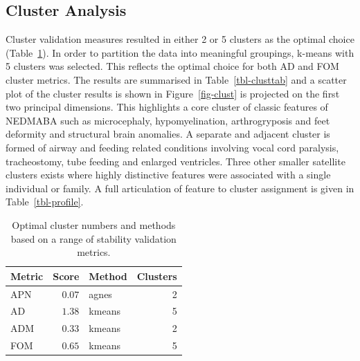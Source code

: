 \documentclass[
  letterpaper,
  DIV=11,
  numbers=noendperiod]{scrartcl}
\begin{document}
\hypertarget{cluster-analysis-1}{%
\subsection{Cluster Analysis}\label{cluster-analysis-1}}

Cluster validation measures resulted in either 2 or 5 clusters as the
optimal choice (Table~\ref{tbl-opticlust}). In order to partition the
data into meaningful groupings, k-means with 5 clusters was selected.
This reflects the optimal choice for both AD and FOM cluster metrics.
The results are summarised in Table~\ref{tbl-clusttab} and a scatter
plot of the cluster results is shown in Figure~\ref{fig-clust} is
projected on the first two principal dimensions. This highlights a core
cluster of classic features of NEDMABA such as microcephaly,
hypomyelination, arthrogryposis and feet deformity and structural brain
anomalies. A separate and adjacent cluster is formed of airway and
feeding related conditions involving vocal cord paralysis, tracheostomy,
tube feeding and enlarged ventricles. Three other smaller satellite
clusters exists where highly distinctive features were associated with a
single individual or family. A full articulation of feature to cluster
assignment is given in Table~\ref{tbl-profile}.

\hypertarget{tbl-opticlust}{}
\begin{longtable}{lrlr}
\caption{\label{tbl-opticlust}Optimal cluster numbers and methods based on a range of stability
validation metrics. }\tabularnewline

\toprule
Metric & Score & Method & Clusters \\ 
\midrule
APN & $0.07$ & agnes & 2 \\ 
AD & $1.38$ & kmeans & 5 \\ 
ADM & $0.33$ & kmeans & 2 \\ 
FOM & $0.65$ & kmeans & 5 \\ 
\bottomrule
\end{longtable}
\end{document}
